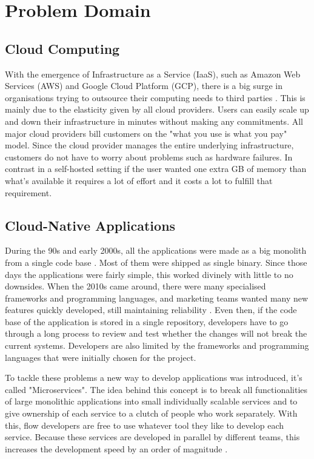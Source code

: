 \section{Problem Domain}

\subsection{Cloud Computing}
With the emergence of Infrastructure as a Service (IaaS), such as Amazon Web Services (AWS) and Google Cloud Platform (GCP), there is a big surge in organisations trying to outsource their computing needs to third parties \citep{rimol_2021}. This is mainly due to the elasticity given by all cloud providers. Users can easily scale up and down their infrastructure in minutes without making any commitments. All major cloud providers bill customers on the "what you use is what you pay" model. Since the cloud provider manages the entire underlying infrastructure, customers do not have to worry about problems such as hardware failures. In contrast in a self-hosted setting if the user wanted one extra GB of memory than what's available it requires a lot of effort and it costs a lot to fulfill that requirement.

\subsection{Cloud-Native Applications}
During the 90s and early 2000s, all the applications were made as a big monolith from a single code base \citep{LessonsF52:online}. Most of them were shipped as single binary. Since those days the applications were fairly simple, this worked divinely with little to no downsides. When the 2010s came around, there were many specialised frameworks and programming languages, and marketing teams wanted many new features quickly developed, still maintaining reliability \citep{di2018migrating,Microser52:online}. Even then, if the code base of the application is stored in a single repository, developers have to go through a long process to review and test whether the changes will not break the current systems. Developers are also limited by the frameworks and programming languages that were initially chosen for the project.

To tackle these problems a new way to develop applications was introduced, it's called "Microservices". The idea behind this concept is to break all functionalities of large monolithic applications into small individually scalable services and to give ownership of each service to a clutch of people who work separately. With this, flow developers are free to use whatever tool they like to develop each service. Because these services are developed in parallel by different teams, this increases the development speed by an order of magnitude \citep{Understa56:online}.

